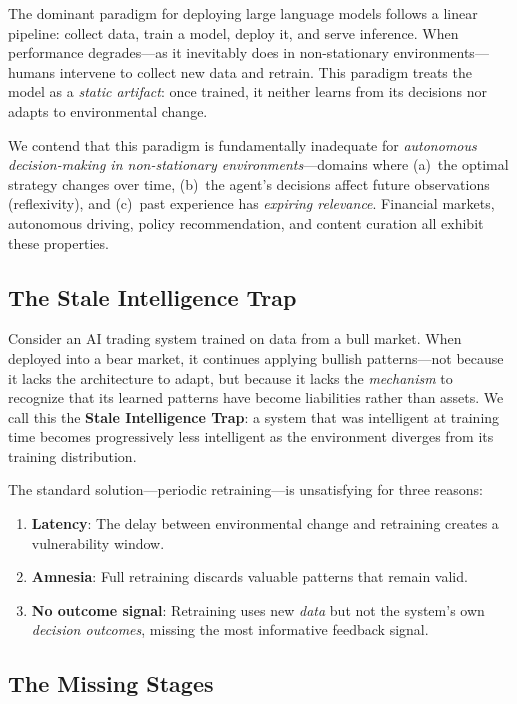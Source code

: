 \documentclass[11pt, a4paper]{article}
\begin{document}
The dominant paradigm for deploying large language models follows a linear pipeline: collect data, train a model, deploy it, and serve inference. When performance degrades---as it inevitably does in non-stationary environments---humans intervene to collect new data and retrain. This paradigm treats the model as a \emph{static artifact}: once trained, it neither learns from its decisions nor adapts to environmental change.

We contend that this paradigm is fundamentally inadequate for \emph{autonomous decision-making in non-stationary environments}---domains where (a)~the optimal strategy changes over time, (b)~the agent's decisions affect future observations (reflexivity), and (c)~past experience has \emph{expiring relevance}. Financial markets, autonomous driving, policy recommendation, and content curation all exhibit these properties.

\subsection{The Stale Intelligence Trap}

Consider an AI trading system trained on data from a bull market. When deployed into a bear market, it continues applying bullish patterns---not because it lacks the architecture to adapt, but because it lacks the \emph{mechanism} to recognize that its learned patterns have become liabilities rather than assets. We call this the \textbf{Stale Intelligence Trap}: a system that was intelligent at training time becomes progressively less intelligent as the environment diverges from its training distribution.

The standard solution---periodic retraining---is unsatisfying for three reasons:
\begin{enumerate}[leftmargin=*]
  \item \textbf{Latency}: The delay between environmental change and retraining creates a vulnerability window.
  \item \textbf{Amnesia}: Full retraining discards valuable patterns that remain valid.
  \item \textbf{No outcome signal}: Retraining uses new \emph{data} but not the system's own \emph{decision outcomes}, missing the most informative feedback signal.
\end{enumerate}

\subsection{The Missing Stages}
\end{document}
